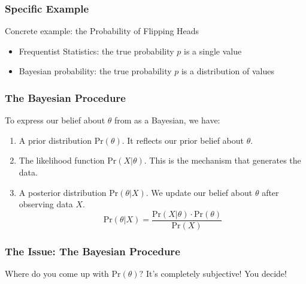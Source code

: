 \documentclass[slides]{beamer}
\newcommand{\blue}[1]{\textcolor{blue2}{#1}}
\newcommand{\prob}{\mbox{Pr}}
\begin{document}
\begin{frame}[fragile]
\frametitle{Specific Example}
Concrete example: the Probability of Flipping Heads
\begin{itemize}
\pause\item \blue{Frequentist Statistics}:  the true probability $p$ is a single value
\pause\item \blue{Bayesian probability}:  the true probability $p$ is a distribution of values
\end{itemize}

\end{frame}



\begin{frame}
\frametitle{The Bayesian Procedure}
To express our belief about $\theta$ from as a Bayesian, we have:
\begin{enumerate}
\pause\item A prior distribution $\prob(\theta)$.  It reflects our \blue{prior} belief about $\theta$.
\pause\item The likelihood function $\prob(X | \theta)$.  This is the mechanism that generates the \blue{data}.
\pause\item A posterior distribution $\prob(\theta | X)$.  We \blue{update} our belief about $\theta$ after observing data $X$.
\[
\prob(\theta | X) = \frac{\prob(X | \theta) \cdot \prob(\theta)}{\prob(X)}
\]
\end{enumerate}
\end{frame}


\begin{frame}
\frametitle{The Issue:  The Bayesian Procedure}

Where do you come up with $\prob(\theta)$?  It's completely \blue{subjective}!  You decide!

\end{frame}
\end{document}

